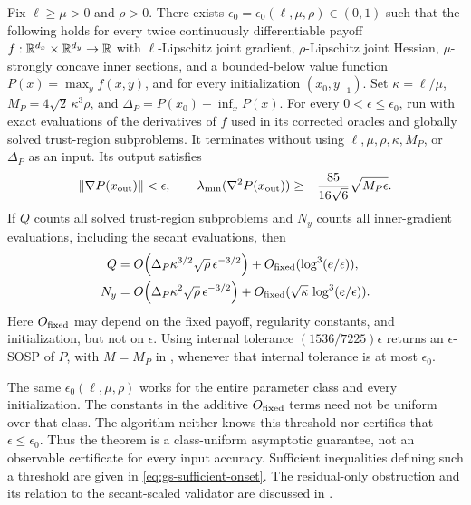 \documentclass{article}
\begin{document}
\begin{theorem}
\label{thm:gradient-scaled-scar}
Fix $\ell\ge\mu>0$ and $\rho>0$.  There exists
$\epsilon_0=\epsilon_0(\ell,\mu,\rho)\in(0,1)$ such that the following
holds for every twice continuously differentiable payoff
$f:\mathbb{R}^{d_x}\times\mathbb{R}^{d_y}\to\mathbb{R}$ with
$\ell$-Lipschitz joint gradient, $\rho$-Lipschitz joint Hessian,
$\mu$-strongly concave inner sections, and a bounded-below value
function $P(x)=\max_y f(x,y)$, and for every initialization
$(x_0,y_{-1})$.  Set
$\kappa=\ell/\mu$, $M_P=4\sqrt2\,\kappa^3\rho$, and
$\Delta_P=P(x_0)-\inf_xP(x)$.
For every $0<\epsilon\le\epsilon_0$, run
 with exact evaluations of the
derivatives of $f$ used in its corrected oracles and globally solved
trust-region subproblems.  It terminates without using
$\ell,\mu,\rho,\kappa,M_P$, or $\Delta_P$ as an input.  Its output satisfies
\begin{equation}\label{eq:gs-return}
 \|\nabla P(x_{\rm out})\|<\epsilon,
 \qquad
 \lambda_{\min}(\nabla^2P(x_{\rm out}))
 \ge-\frac{85}{16\sqrt6}\sqrt{M_P\epsilon}.
\end{equation}
If $Q$ counts all solved trust-region subproblems and $N_y$ counts
all inner-gradient evaluations, including the secant evaluations, then
\begin{subequations}\label{eq:gs-complexities}
\begin{align}
 Q&=O\!\left(\Delta_P\kappa^{3/2}\sqrt\rho\,\epsilon^{-3/2}\right)
     +O_{\rm fixed}(\log^3(e/\epsilon)),
     \label{eq:gs-outer-complexity}\\
 N_y&=O\!\left(
       \Delta_P\kappa^2\sqrt\rho\,\epsilon^{-3/2}\right)
       +O_{\rm fixed}(\sqrt\kappa\,\log^3(e/\epsilon)).
     \label{eq:gs-inner-complexity}
\end{align}
\end{subequations}
Here $O_{\rm fixed}$ may depend on the fixed payoff, regularity
constants, and initialization, but not on $\epsilon$.
Using internal tolerance $(1536/7225)\epsilon$ returns an
$\epsilon$-SOSP of $P$, with $M=M_P$ in
, whenever that internal tolerance is at most
$\epsilon_0$.
\end{theorem}

\begin{remark}
\label{rem:class-uniform-scope}
The same $\epsilon_0(\ell,\mu,\rho)$ works for the entire parameter
class and every initialization.  The constants in the additive
$O_{\rm fixed}$ terms need not be uniform over that class.
The algorithm neither knows this threshold nor certifies that
$\epsilon\le\epsilon_0$.  Thus the theorem is a class-uniform
asymptotic guarantee, not an observable certificate for every input
accuracy.  Sufficient inequalities defining such a threshold are
given in \eqref{eq:gs-sufficient-onset}.  The residual-only obstruction
and its relation to the secant-scaled validator are discussed in
.
\end{remark}
\end{document}
